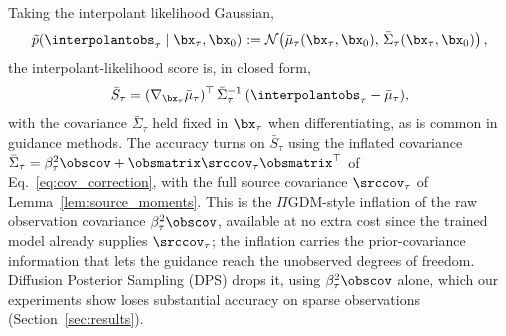     Taking the interpolant likelihood Gaussian,
    \begin{align}\label{eq:interpolant_likelihood_gaussian}
        \tilde{p}(\interpolantobs_\tau \mid \bx_\tau, \bx_0)
        := \mathcal{N}\!\left(\bar{\mu}_\tau(\bx_\tau, \bx_0),\, \bar{\Sigma}_\tau(\bx_\tau, \bx_0)\right),
    \end{align}
    the interpolant-likelihood score is, in closed form,
    \begin{align}\label{eq:interpolant_score_closed}
        \bar{S}_\tau
        = (\nabla_{\bx_\tau}\bar{\mu}_\tau)^\top\,\bar{\Sigma}_\tau^{-1}\,(\interpolantobs_\tau - \bar{\mu}_\tau),
    \end{align}
    with the covariance $\bar{\Sigma}_\tau$ held fixed in $\bx_\tau$ when differentiating, as is common in guidance methods. The accuracy turns on $\bar S_\tau$ using the inflated covariance $\bar{\Sigma}_\tau = \beta_\tau^2\obscov + \obsmatrix\srccov_\tau\obsmatrix^\top$ of Eq.~\eqref{eq:cov_correction}, with the full source covariance $\srccov_\tau$ of Lemma~\ref{lem:source_moments}. This is the $\Pi$GDM-style inflation \cite{song_pseudoinverse_2023} of the raw observation covariance $\beta_\tau^2\obscov$, available at no extra cost since the trained model already supplies $\srccov_\tau$; the inflation carries the prior-covariance information that lets the guidance reach the unobserved degrees of freedom. Diffusion Posterior Sampling (DPS) \cite{chung_diffusion_2023, chung_improving_2024, song_score-based_2021} drops it, using $\beta_\tau^2\obscov$ alone, which our experiments show loses substantial accuracy on sparse observations (Section~\ref{sec:results}).



